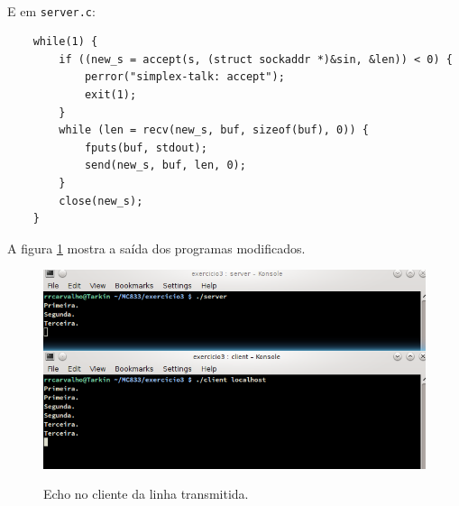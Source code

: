 \documentclass[a4paper,10pt,oneside,final,titlepage,onecolumn]{article}
\begin{document}
\paragraph{}E em \verb|server.c|:
\begin{lstlisting}
	while(1) {
		if ((new_s = accept(s, (struct sockaddr *)&sin, &len)) < 0) {
			perror("simplex-talk: accept");
			exit(1);
		}
		while (len = recv(new_s, buf, sizeof(buf), 0)) {
			fputs(buf, stdout);
			send(new_s, buf, len, 0);
		}
		close(new_s);
	}
\end{lstlisting}
A figura \ref{echo} mostra a saída dos programas modificados.
\begin{figure}[!ht]
  \caption{Echo no cliente da linha transmitida.}
  \centering
  \includegraphics[width=117mm]{images/echo.png}
  \label{echo}
\end{figure}
\end{document}
